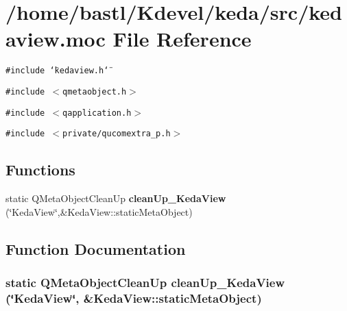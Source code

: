 \section{/home/bastl/Kdevel/keda/src/kedaview.moc File Reference}
\label{kedaview_8moc}
{\tt \#include \char`\"{}kedaview.h\char`\"{}}\par
{\tt \#include $<$qmetaobject.h$>$}\par
{\tt \#include $<$qapplication.h$>$}\par
{\tt \#include $<$private/qucomextra\_\-p.h$>$}\par
\subsection*{Functions}
\begin{CompactItemize}
\item 
static QMeta\-Object\-Clean\-Up {\bf clean\-Up\_\-Keda\-View} (\char`\"{}Keda\-View\char`\"{},\&Keda\-View::static\-Meta\-Object)
\end{CompactItemize}


\subsection{Function Documentation}
\subsubsection{\setlength{\rightskip}{0pt plus 5cm}static QMeta\-Object\-Clean\-Up clean\-Up\_\-Keda\-View (\char`\"{}Keda\-View\char`\"{}, \&Keda\-View::static\-Meta\-Object)\hspace{0.3cm}{\tt  [static]}}\label{kedaview_8moc_faa34a9f70f05cf71090373d87c12b0b}



